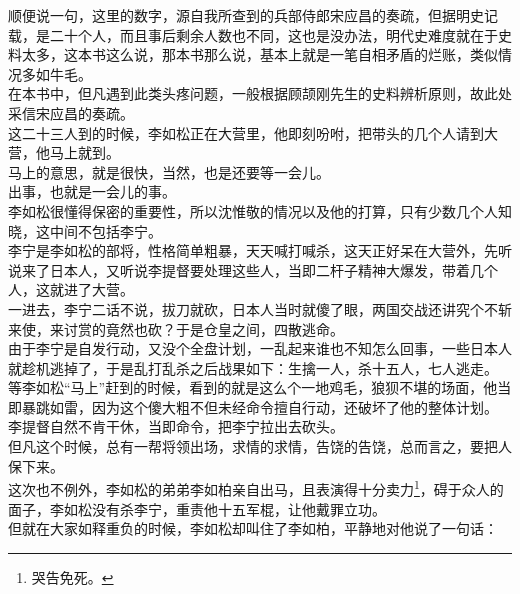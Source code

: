 \begin{multicols}{\theparacolNo}
顺便说一句，这里的数字，源自我所查到的兵部侍郎宋应昌的奏疏，但据明史记载，是二十个人，而且事后剩余人数也不同，这也是没办法，明代史难度就在于史料太多，这本书这么说，那本书那么说，基本上就是一笔自相矛盾的烂账，类似情况多如牛毛。\\

在本书中，但凡遇到此类头疼问题，一般根据顾颉刚先生的史料辨析原则，故此处采信宋应昌的奏疏。\\

这二十三人到的时候，李如松正在大营里，他即刻吩咐，把带头的几个人请到大营，他马上就到。\\

马上的意思，就是很快，当然，也是还要等一会儿。\\

出事，也就是一会儿的事。\\

李如松很懂得保密的重要性，所以沈惟敬的情况以及他的打算，只有少数几个人知晓，这中间不包括李宁。\\

李宁是李如松的部将，性格简单粗暴，天天喊打喊杀，这天正好呆在大营外，先听说来了日本人，又听说李提督要处理这些人，当即二杆子精神大爆发，带着几个人，这就进了大营。\\

一进去，李宁二话不说，拔刀就砍，日本人当时就傻了眼，两国交战还讲究个不斩来使，来讨赏的竟然也砍？于是仓皇之间，四散逃命。\\

由于李宁是自发行动，又没个全盘计划，一乱起来谁也不知怎么回事，一些日本人就趁机逃掉了，于是乱打乱杀之后战果如下：生擒一人，杀十五人，七人逃走。\\

等李如松“马上”赶到的时候，看到的就是这么个一地鸡毛，狼狈不堪的场面，他当即暴跳如雷，因为这个傻大粗不但未经命令擅自行动，还破坏了他的整体计划。\\

李提督自然不肯干休，当即命令，把李宁拉出去砍头。\\

但凡这个时候，总有一帮将领出场，求情的求情，告饶的告饶，总而言之，要把人保下来。\\

这次也不例外，李如松的弟弟李如柏亲自出马，且表演得十分卖力\footnote{哭告免死。}，碍于众人的面子，李如松没有杀李宁，重责他十五军棍，让他戴罪立功。\\

但就在大家如释重负的时候，李如松却叫住了李如柏，平静地对他说了一句话：\\


\end{multicols}
